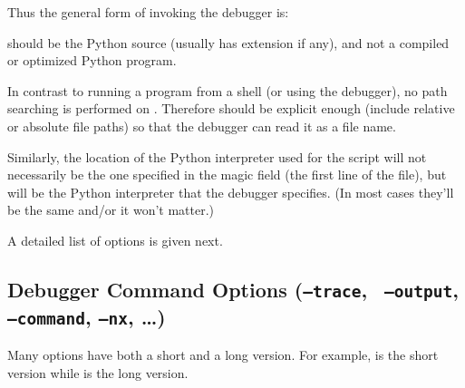 Thus the general form of invoking the debugger is:

 

 should be the Python source (usually has extension
 if any), and not a compiled or optimized Python program.

In contrast to running a program from a shell (or using the 
debugger), no path searching is performed on
. Therefore  should be explicit
enough (include relative or absolute file paths) so that the debugger
can read it as a file name. 

Similarly, the location of the Python interpreter used for the script
will not necessarily be the one specified in the magic field (the
first line of the file), but will be the Python interpreter that the
debugger specifies. (In most cases they'll be the same and/or it won't
matter.)

A detailed list of options is given next. 

\subsection{Debugger Command Options ({\tt --trace}, {\tt
    --output}, {\tt --command}, {\tt --nx}, \ldots)\label{subsection-switches}}

Many options have both a short and a long version. For example,
 is the short version while  is the long
version.

